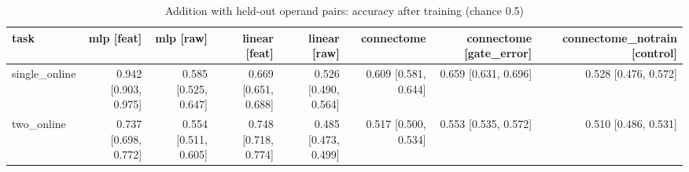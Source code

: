 \begin{table}[t]
\centering
\small
\begin{tabular}{lrrrrrrr}
\toprule
task & mlp [feat] & mlp [raw] & linear [feat] & linear [raw] & connectome & connectome [gate\_error] & connectome\_notrain [control] \\
\midrule
single\_online & 0.942 [0.903, 0.975] & 0.585 [0.525, 0.647] & 0.669 [0.651, 0.688] & 0.526 [0.490, 0.564] & 0.609 [0.581, 0.644] & 0.659 [0.631, 0.696] & 0.528 [0.476, 0.572] \\
two\_online & 0.737 [0.698, 0.772] & 0.554 [0.511, 0.605] & 0.748 [0.718, 0.774] & 0.485 [0.473, 0.499] & 0.517 [0.500, 0.534] & 0.553 [0.535, 0.572] & 0.510 [0.486, 0.531] \\
\bottomrule
\end{tabular}
\caption{Addition with held-out operand pairs: accuracy after training (chance 0.5)}
\label{tab:disjoint_addition_final_acc}
\end{table}